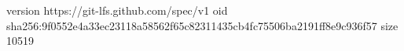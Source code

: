 version https://git-lfs.github.com/spec/v1
oid sha256:9f0552e4a33ec23118a58562f65c82311435cb4fc75506ba2191ff8e9c936f57
size 10519
